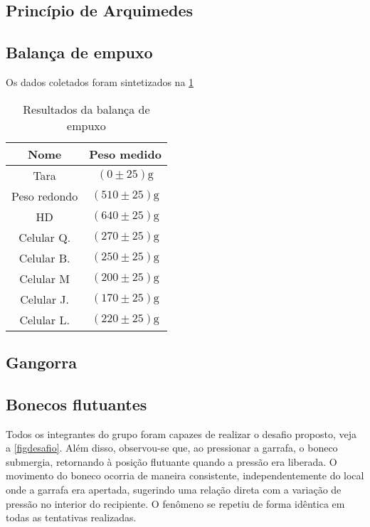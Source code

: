 \subsection{Princípio de Arquimedes}


\subsection{Balança de empuxo}

Os dados coletados foram sintetizados na \cref{tab1}
\begin{table}
    \caption{Resultados da balança de empuxo}
    \label{tab1}
    \begin{center}
        \begin{tabular}{c c}
            \hline
            Nome & Peso medido \\
            \hline
            Tara & \( (0 \pm 25) \unit{\gram} \)\\
            Peso redondo & \( (510 \pm 25) \unit{\gram} \)\\
            HD & \( (640 \pm 25) \unit{\gram} \)\\
            Celular Q. & \( (270 \pm 25) \unit{\gram} \)\\
            Celular B. & \( (250 \pm 25) \unit{\gram} \)\\
            Celular M & \( (200 \pm 25) \unit{\gram} \)\\
            Celular J. & \( (170 \pm 25) \unit{\gram} \)\\
            Celular L. & \( (220 \pm 25) \unit{\gram} \)\\
            \hline
    \end{tabular}
    \end{center}
\end{table}

\subsection{Gangorra}


\subsection{Bonecos flutuantes}

Todos os integrantes do grupo foram capazes de realizar o desafio proposto, veja
a \cref{figdesafio}. Além disso, observou-se que, ao pressionar a garrafa, o
boneco submergia, retornando à posição flutuante quando a pressão era liberada.
O movimento do boneco ocorria de maneira consistente, independentemente do local
onde a garrafa era apertada, sugerindo uma relação direta com a variação de
pressão no interior do recipiente. O fenômeno se repetiu de forma idêntica em
todas as tentativas realizadas.


